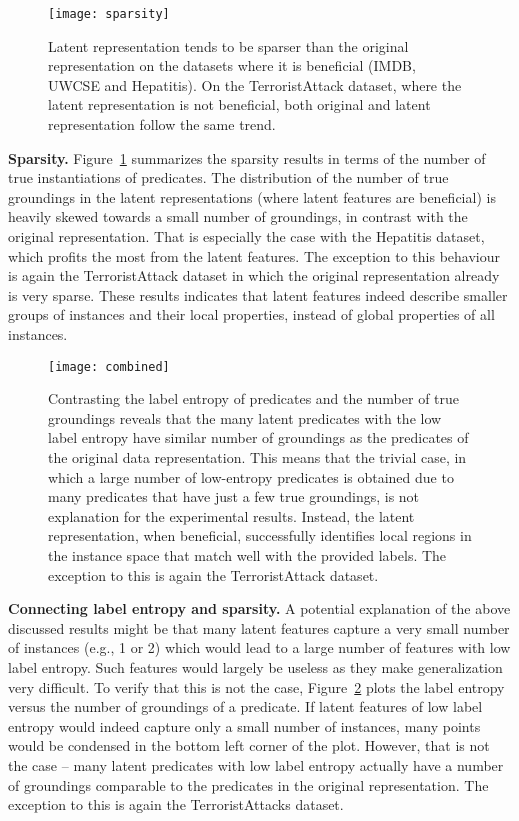 \begin{figure}
	\centering
	\medskip
    \texttt{[image: sparsity]}
    \caption{Latent representation tends to be sparser than the original representation on the datasets where it is beneficial (IMDB, UWCSE and Hepatitis). On the TerroristAttack dataset, where the latent representation is not beneficial, both original and latent representation follow the same trend. }
    \label{fig:Sparsity}
\end{figure}


\textbf{Sparsity.}
Figure~\ref{fig:Sparsity} summarizes the sparsity results in terms of the number of true instantiations of predicates.
The distribution of the number of true groundings in the latent representations (where latent features are beneficial) is heavily skewed towards a small number of groundings, in contrast with the original representation.
That is especially the case with the Hepatitis dataset, which profits the most from the latent features.
The exception to this behaviour is again the TerroristAttack dataset in which the original representation already is very sparse.
These results indicates that latent features indeed describe smaller groups of instances and their local properties, instead of global properties of all instances.





\begin{figure}
	\centering
	\medskip
    \texttt{[image: combined]}
    \caption{Contrasting the label entropy of predicates and the number of true groundings reveals that the many latent predicates with the low label entropy have similar number of groundings as the predicates of the original data representation. This means that the trivial case, in which a large number of low-entropy predicates is obtained due to many predicates that have just a few true groundings, is not explanation for the experimental results. Instead, the latent representation, when beneficial, successfully identifies local regions in the instance space that match well with the provided labels. The exception to this is again the TerroristAttack dataset.}
    \label{fig:EntropyVsSparsity}
\end{figure}




\textbf{Connecting label entropy and sparsity.}
A potential explanation of the above discussed results might be that many latent features capture a very small number of instances (e.g., 1 or 2) which would lead to a large number of features with low label entropy.
Such features would largely be useless as they make generalization very difficult.
To verify that this is not the case, Figure~\ref{fig:EntropyVsSparsity} plots the label entropy versus the number of groundings of a predicate.
If latent features of low label entropy would indeed capture only a small number of instances, many points would be condensed in the bottom left corner of the plot.
However, that is not the case -- many latent predicates with low label entropy actually have a number of groundings comparable to the predicates in the original representation.
The exception to this is again the TerroristAttacks dataset.

